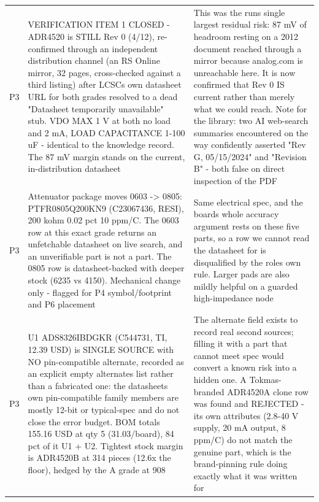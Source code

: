 \documentclass[11pt,a4paper]{article}
\begin{document}
{\begin{longtable}{lp{5.2cm}p{7.2cm}}
P3 & VERIFICATION ITEM 1 CLOSED - ADR4520 is STILL Rev 0 (4/12), re-confirmed through an independent distribution channel (an RS Online mirror, 32 pages, cross-checked against a third listing) after LCSCs own datasheet URL for both grades resolved to a dead "Datasheet temporarily unavailable" stub. VDO MAX 1 V at both no load and 2 mA, LOAD CAPACITANCE 1-100 uF - identical to the knowledge record. The 87 mV margin stands on the current, in-distribution datasheet & This was the runs single largest residual risk: 87 mV of headroom resting on a 2012 document reached through a mirror because analog.com is unreachable here. It is now confirmed that Rev 0 IS current rather than merely what we could reach. Note for the library: two AI web-search summaries encountered on the way confidently asserted "Rev G, 05/15/2024" and "Revision B" - both false on direct inspection of the PDF \\
P3 & Attenuator package moves 0603 -\textgreater{} 0805: PTFR0805Q200KN9 (C23067436, RESI), 200 kohm 0.02 pct 10 ppm/C. The 0603 row at this exact grade returns an unfetchable datasheet on live search, and an unverifiable part is not a part. The 0805 row is datasheet-backed with deeper stock (6235 vs 4150). Mechanical change only - flagged for P4 symbol/footprint and P6 placement & Same electrical spec, and the boards whole accuracy argument rests on these five parts, so a row we cannot read the datasheet for is disqualified by the roles own rule. Larger pads are also mildly helpful on a guarded high-impedance node \\
P3 & U1 ADS8326IBDGKR (C544731, TI, 12.39 USD) is SINGLE SOURCE with NO pin-compatible alternate, recorded as an explicit empty alternates list rather than a fabricated one: the datasheets own pin-compatible family members are mostly 12-bit or typical-spec and do not close the error budget. BOM totals 155.16 USD at qty 5 (31.03/board), 84 pct of it U1 + U2. Tightest stock margin is ADR4520B at 314 pieces (12.6x the floor), hedged by the A grade at 908 & The alternate field exists to record real second sources; filling it with a part that cannot meet spec would convert a known risk into a hidden one. A Tokmas-branded ADR4520A clone row was found and REJECTED - its own attributes (2.8-40 V supply, 20 mA output, 8 ppm/C) do not match the genuine part, which is the brand-pinning rule doing exactly what it was written for \\

\end{longtable}}
\end{document}
